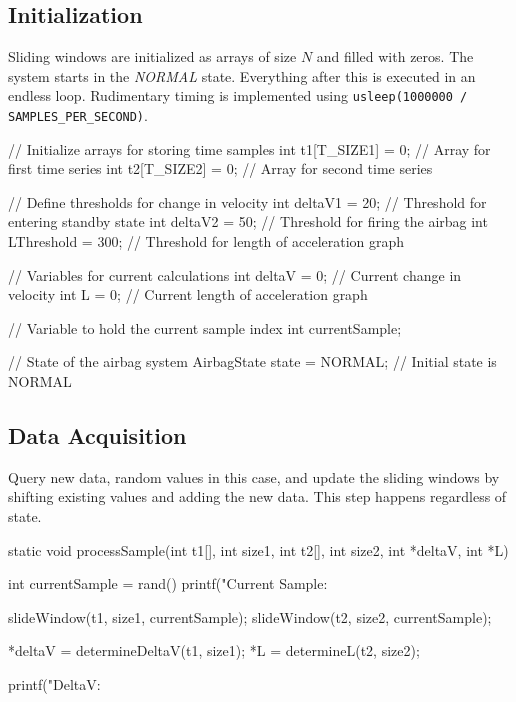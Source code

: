 \subsection{Initialization} Sliding windows are initialized as arrays of size $N$ and filled with zeros. The system starts in the \emph{NORMAL} state. Everything after this is executed in an endless loop. Rudimentary timing is implemented using \texttt{usleep(1000000 / SAMPLES\_PER\_SECOND)}.

\begin{CCode}
    // Initialize arrays for storing time samples
    int t1[T_SIZE1] = {0}; // Array for first time series
    int t2[T_SIZE2] = {0}; // Array for second time series

    // Define thresholds for change in velocity
    int deltaV1 = 20; // Threshold for entering standby state
    int deltaV2 = 50; // Threshold for firing the airbag
    int LThreshold = 300; // Threshold for length of acceleration graph

    // Variables for current calculations
    int deltaV = 0; // Current change in velocity
    int L = 0; // Current length of acceleration graph

    // Variable to hold the current sample index
    int currentSample;

    // State of the airbag system
    AirbagState state = NORMAL; // Initial state is NORMAL
\end{CCode}

\subsection{Data Acquisition} Query new data, random values in this case, and update the sliding windows by shifting existing values and adding the new data. This step happens regardless of state. 

\begin{CCode}
    static void processSample(int t1[], int size1, int t2[], int size2, int *deltaV, int *L)
    {
    int currentSample = rand() %
    printf("Current Sample: %

    slideWindow(t1, size1, currentSample);
    slideWindow(t2, size2, currentSample);

    *deltaV = determineDeltaV(t1, size1);
    *L = determineL(t2, size2);

    printf("DeltaV: %
}

\end{CCode}

